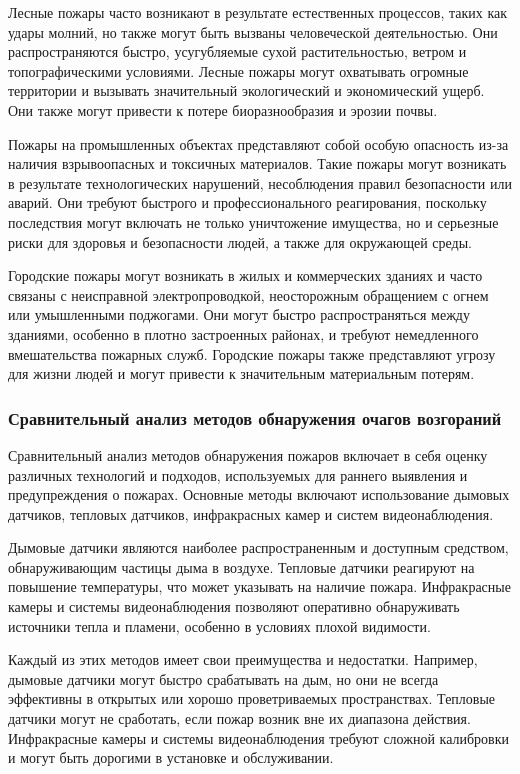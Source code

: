 Лесные пожары часто возникают в результате естественных процессов, таких как удары молний, но также могут быть вызваны человеческой деятельностью. Они распространяются быстро, усугубляемые сухой растительностью, ветром и топографическими условиями. Лесные пожары могут охватывать огромные территории и вызывать значительный экологический и экономический ущерб. Они также могут привести к потере биоразнообразия и эрозии почвы.

Пожары на промышленных объектах представляют собой особую опасность из-за наличия взрывоопасных и токсичных материалов. Такие пожары могут возникать в результате технологических нарушений, несоблюдения правил безопасности или аварий. Они требуют быстрого и профессионального реагирования, поскольку последствия могут включать не только уничтожение имущества, но и серьезные риски для здоровья и безопасности людей, а также для окружающей среды.

Городские пожары могут возникать в жилых и коммерческих зданиях и часто связаны с неисправной электропроводкой, неосторожным обращением с огнем или умышленными поджогами. Они могут быстро распространяться между зданиями, особенно в плотно застроенных районах, и требуют немедленного вмешательства пожарных служб. Городские пожары также представляют угрозу для жизни людей и могут привести к значительным материальным потерям.
\subsubsection{Сравнительный анализ методов обнаружения очагов возгораний}
Сравнительный анализ методов обнаружения пожаров включает в себя оценку различных технологий и подходов, используемых для раннего выявления и предупреждения о пожарах. Основные методы включают использование дымовых датчиков, тепловых датчиков, инфракрасных камер и систем видеонаблюдения.

Дымовые датчики являются наиболее распространенным и доступным средством, обнаруживающим частицы дыма в воздухе. Тепловые датчики реагируют на повышение температуры, что может указывать на наличие пожара. Инфракрасные камеры и системы видеонаблюдения позволяют оперативно обнаруживать источники тепла и пламени, особенно в условиях плохой видимости.

Каждый из этих методов имеет свои преимущества и недостатки. Например, дымовые датчики могут быстро срабатывать на дым, но они не всегда эффективны в открытых или хорошо проветриваемых пространствах. Тепловые датчики могут не сработать, если пожар возник вне их диапазона действия. Инфракрасные камеры и системы видеонаблюдения требуют сложной калибровки и могут быть дорогими в установке и обслуживании.

